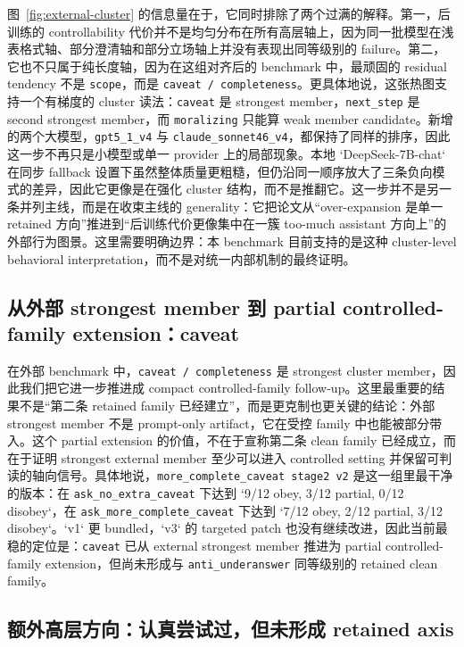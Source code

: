 \documentclass[12pt]{ctexart}
\begin{document}
图~\ref{fig:external-cluster} 的信息量在于，它同时排除了两个过满的解释。第一，后训练的 controllability 代价并不是均匀分布在所有高层轴上，因为同一批模型在浅表格式轴、部分澄清轴和部分立场轴上并没有表现出同等级别的 failure。第二，它也不只属于纯长度轴，因为在这组对齐后的 benchmark 中，最顽固的 residual tendency 不是 \texttt{scope}，而是 \texttt{caveat / completeness}。更具体地说，这张热图支持一个有梯度的 cluster 读法：\texttt{caveat} 是 strongest member，\texttt{next\_step} 是 second strongest member，而 \texttt{moralizing} 只能算 weak member candidate。新增的两个大模型，\texttt{gpt5\_1\_v4} 与 \texttt{claude\_sonnet46\_v4}，都保持了同样的排序，因此这一步不再只是小模型或单一 provider 上的局部现象。本地 `DeepSeek-7B-chat` 在同步 fallback 设置下虽然整体质量更粗糙，但仍沿同一顺序放大了三条负向模式的差异，因此它更像是在强化 cluster 结构，而不是推翻它。这一步并不是另一条并列主线，而是在收束主线的 generality：它把论文从“over-expansion 是单一 retained 方向”推进到“后训练代价更像集中在一簇 too-much assistant 方向上”的外部行为图景。这里需要明确边界：本 benchmark 目前支持的是这种 cluster-level behavioral interpretation，而不是对统一内部机制的最终证明。

\subsection{从外部 strongest member 到 partial controlled-family extension：caveat}

在外部 benchmark 中，\texttt{caveat / completeness} 是 strongest cluster member，因此我们把它进一步推进成 compact controlled-family follow-up。这里最重要的结果不是“第二条 retained family 已经建立”，而是更克制也更关键的结论：外部 strongest member 不是 prompt-only artifact，它在受控 family 中也能被部分带入。这个 partial extension 的价值，不在于宣称第二条 clean family 已经成立，而在于证明 strongest external member 至少可以进入 controlled setting 并保留可判读的轴向信号。具体地说，\texttt{more\_complete\_caveat stage2 v2} 是这一组里最干净的版本：在 \texttt{ask\_no\_extra\_caveat} 下达到 `9/12 obey, 3/12 partial, 0/12 disobey`，在 \texttt{ask\_more\_complete\_caveat} 下达到 `7/12 obey, 2/12 partial, 3/12 disobey`。`v1` 更 bundled，`v3` 的 targeted patch 也没有继续改进，因此当前最稳的定位是：\texttt{caveat} 已从 external strongest member 推进为 partial controlled-family extension，但尚未形成与 \texttt{anti\_underanswer} 同等级别的 retained clean family。

\subsection{额外高层方向：认真尝试过，但未形成 retained axis}
\end{document}
